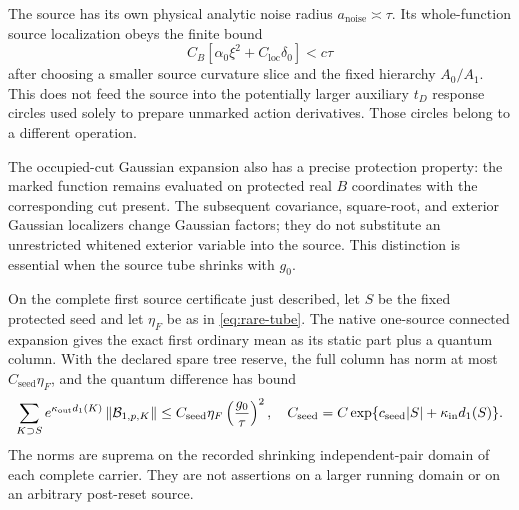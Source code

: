 The source has its own physical analytic noise radius $a_{\mathrm{noise}}\asymp\tau$. Its whole-function source localization obeys the finite bound
\begin{equation}\label{eq:source-image}
 C_B[\alpha_0\xi^2+C_{\mathrm{loc}}\delta_0]<c\tau
\end{equation}
after choosing a smaller source curvature slice and the fixed hierarchy $A_0/A_1$. This does not feed the source into the potentially larger auxiliary $t_D$ response circles used solely to prepare unmarked action derivatives. Those circles belong to a different operation.

The occupied-cut Gaussian expansion also has a precise protection property: the marked function remains evaluated on protected real $B$ coordinates with the corresponding cut present. The subsequent covariance, square-root, and exterior Gaussian localizers change Gaussian factors; they do not substitute an unrestricted whitened exterior variable into the source. This distinction is essential when the source tube shrinks with $g_0$.

\begin{proposition}\label{prop:first-column}
On the complete first source certificate just described, let $S$ be the fixed protected seed and let $\eta_F$ be as in \eqref{eq:rare-tube}. The native one-source connected expansion gives the exact first ordinary mean as its static part plus a quantum column. With the declared spare tree reserve, the full column has norm at most $C_{\mathrm{seed}}\eta_F$, and the quantum difference has bound
\begin{equation}\label{eq:first-quantum-bound}
 \sum_{K\supset S}e^{\kappa_{\mathrm{out}}d_1(K)}
       \left\lVert \mathcal B_{1,p,K}\right\rVert
 \le C_{\mathrm{seed}}\eta_F\left(\frac{g_0}{\tau}\right)^2,
 \quad
 C_{\mathrm{seed}}=C\exp\{c_{\mathrm{seed}}|S|+
                           \kappa_{\mathrm{in}}d_1(S)\}.
\end{equation}
The norms are suprema on the recorded shrinking independent-pair domain of each complete carrier. They are not assertions on a larger running domain or on an arbitrary post-reset source.
\end{proposition}

